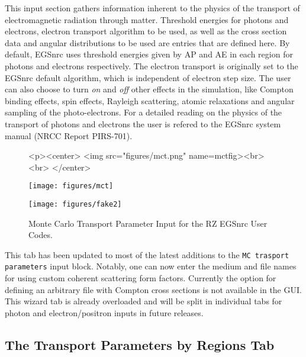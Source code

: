 \documentclass[12pt,twoside]{article}   %
\begin{document}
This input section gathers information inherent to the physics of the transport of electromagnetic
radiation through matter. Threshold energies for photons and electrons, electron transport algorithm
to be used, as well as the cross section data and angular distributions to be used are entries that
are defined here. By default, EGSnrc uses threshold energies given by AP and AE in each region
for photons and electrons respectively. The electron transport is originally set to the EGSnrc default
algorithm, which is independent of electron step size. The user can also choose to turn {\em on}
and {\em off} other effects in the simulation, like Compton binding effects, spin effects, Rayleigh
scattering, atomic relaxations and angular sampling of the photo-electrons. For a detailed
reading on the physics of the transport of photons and electrons the user is refered to the
EGSnrc system manual (NRCC Report PIRS-701\cite{Ka09a}).\\

\begin{figure}[htb]
\begin{htmlonly}
\begin{rawhtml}
<p><center>
<img src="figures/mct.png" name=mctfig><br><br>
</center>
\end{rawhtml}
\end{htmlonly}
\begin{latexonly}
\begin{center}
\texttt{[image: figures/mct]}
\end{center}
\end{latexonly}
\begin{center}
\texttt{[image: figures/fake2]}
\end{center}
\caption{Monte Carlo Transport Parameter Input for the RZ EGSnrc User Codes.}
\label{mctfig}
\end{figure}

This tab has been updated to most of the latest additions to the {\tt MC trasport parameters}
input block. Notably, one can now enter the medium and file names for using custom coherent
scattering form factors. Currently the option for defining an arbitrary file with Compton
cross sections is not available in the GUI. This wizard tab is already overloaded and will
be split in individual tabs for photon and electron/positron inputs in future releases.

\newpage
\subsection{The Transport Parameters by Regions Tab}
\end{document}
